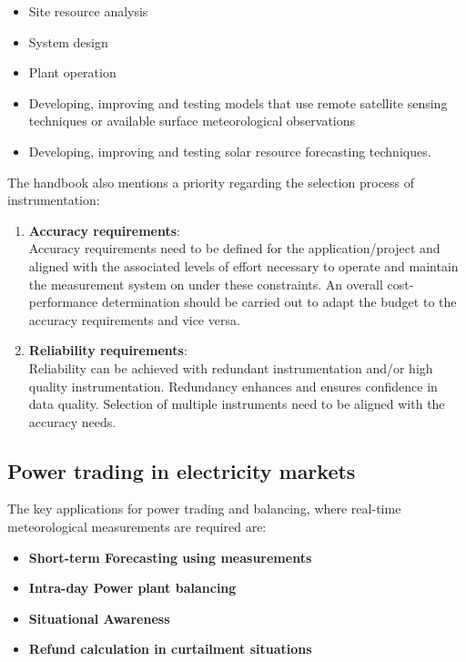 \begin{itemize}
    \item Site resource analysis
     \item System design
     \item Plant operation 
     \item Developing, improving and testing models that use remote satellite sensing techniques or available surface meteorological observations
    \item Developing, improving and testing solar resource forecasting techniques.
\end{itemize}

The handbook \citep{nrelhandbook2021} also mentions a priority regarding the selection process of instrumentation:
\begin{enumerate}
    \item \textbf{Accuracy requirements}:\\
    Accuracy requirements need to be defined for the application/project and aligned with the associated levels of effort necessary to operate and maintain the measurement system on under these constraints. An overall cost-performance determination should be carried out to adapt the budget to the accuracy requirements and vice versa.
    \item \textbf{Reliability requirements}:\\
     Reliability can be achieved with redundant instrumentation and/or high quality instrumentation. Redundancy enhances and ensures confidence in data quality. Selection of multiple instruments need to be aligned with the accuracy needs. 
\end{enumerate}




\subsection{Power trading in electricity markets }
{\color{magenta}{Contributing author: COM, JB}}

The key applications for power trading and balancing, where real-time meteorological measurements are required are: 

\begin{itemize}
    \item \textbf{Short-term Forecasting using measurements}
    \item \textbf{Intra-day Power plant balancing}
    \item \textbf{Situational Awareness}
    \item \textbf{Refund calculation in curtailment situations}
\end{itemize}





